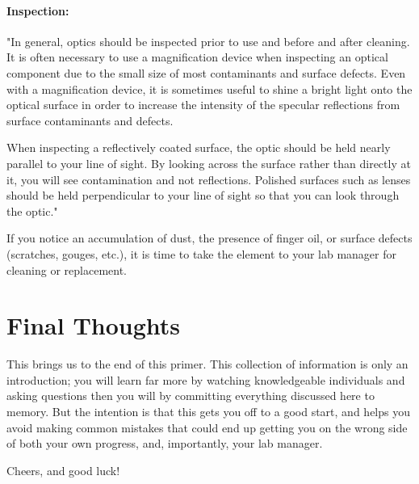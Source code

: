 \documentclass[11pt]{article}
\begin{document}
\paragraph{Inspection:}

\begin{displayquote}
"In general, optics should be inspected prior to use and before and after cleaning. It is often necessary to use a magnification device when inspecting an optical component due to the small size of most contaminants and surface defects. Even with a magnification device, it is sometimes useful to shine a bright light onto the optical surface in order to increase the intensity of the specular reflections from surface contaminants and defects.

When inspecting a reflectively coated surface, the optic should be held nearly parallel to your line of sight. By looking across the surface rather than directly at it, you will see contamination and not reflections. Polished surfaces such as lenses should be held perpendicular to your line of sight so that you can look through the optic."\cite{website:ThorLabs}
\end{displayquote}

If you notice an accumulation of dust, the presence of finger oil, or surface defects (scratches, gouges, etc.), it is time to take the element to your lab manager for cleaning or replacement.







\section{Final Thoughts}

This brings us to the end of this primer. This collection of information is only an introduction; you will learn far more by watching knowledgeable individuals and asking questions then you will by committing everything discussed here to memory. But the intention is that this gets you off to a good start, and helps you avoid making common mistakes that could end up getting you on the wrong side of both your own progress, and, importantly, your lab manager.

Cheers, and good luck!


\newpage


\printbibliography
\end{document}
